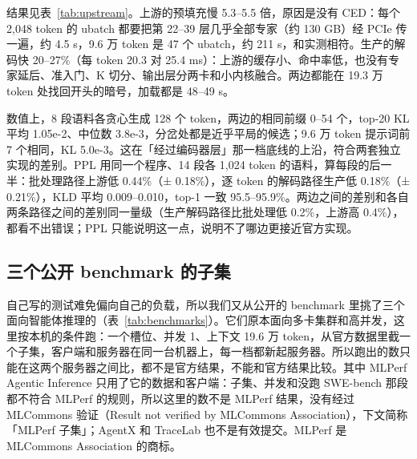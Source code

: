 \documentclass[11pt,a4paper]{article}
\begin{document}
结果见表~\ref{tab:upstream}。上游的预填充慢 5.3--5.5 倍，原因是没有 CED：每个 2,048 token 的 ubatch 都要把第 22--39 层几乎全部专家（约 130 GB）经 PCIe 传一遍，约 4.5 s，9.6 万 token 是 47 个 ubatch，约 211 s，和实测相符。生产的解码快 20--27\%（每 token 20.3 对 25.4 ms）：上游的缓存小、命中率低，也没有专家延后、准入门、K 切分、输出层分两卡和小内核融合。两边都能在 19.3 万 token 处找回开头的暗号，加载都是 48--49 s。

数值上，8 段语料各贪心生成 128 个 token，两边的相同前缀 0--54 个，top-20 KL 平均 1.05e-2、中位数 3.8e-3，分岔处都是近乎平局的候选；9.6 万 token 提示词前 7 个相同，KL 5.0e-3。这在「经过编码器层」那一档底线的上沿，符合两套独立实现的差别。PPL 用同一个程序、14 段各 1,024 token 的语料，算每段的后一半：批处理路径上游低 0.44\%（± 0.18\%），逐 token 的解码路径生产低 0.18\%（± 0.21\%），KLD 平均 0.009--0.010，top-1 一致 95.5--95.9\%。两边之间的差别和各自两条路径之间的差别同一量级（生产解码路径比批处理低 0.2\%，上游高 0.4\%），都看不出错误；PPL 只能说明这一点，说明不了哪边更接近官方实现。

\subsection{三个公开 benchmark 的子集}
\label{sec:benchmarks}

自己写的测试难免偏向自己的负载，所以我们又从公开的 benchmark 里挑了三个面向智能体推理的（表~\ref{tab:benchmarks}）。它们原本面向多卡集群和高并发，这里按本机的条件跑：一个槽位、并发 1、上下文 19.6 万 token，从官方数据里截一个子集，客户端和服务器在同一台机器上，每一档都新起服务器。所以跑出的数只能在这两个服务器之间比，都不是官方结果，不能和官方结果比较。其中 MLPerf Agentic Inference 只用了它的数据和客户端：子集、并发和没跑 SWE-bench 那段都不符合 MLPerf 的规则，所以这里的数不是 MLPerf 结果，没有经过 MLCommons 验证（Result not verified by MLCommons Association），下文简称「MLPerf 子集」；AgentX 和 TraceLab 也不是有效提交。MLPerf 是 MLCommons Association 的商标。
\end{document}
